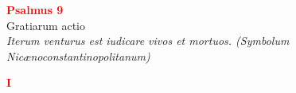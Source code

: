 


\def\greinitialformat#1{%
{\fontsize{39}{39}\selectfont #1}%
}




\vspace{0.3cm}
\begin{center}
 \textcolor{red}{\large \bf Psalmus 9}\\
Gratiarum actio\\
\textit{\small Iterum venturus est iudicare vivos et mortuos. (Symbolum Nicænoconstantinopolitanum)}
\end{center}
\begin{center}
 \textcolor{red}{\bf I}
\end{center}
